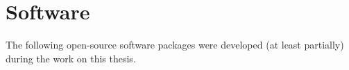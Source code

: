 \chapter*{Software}
The following open-source software packages were developed (at least partially) during the work
on this thesis.

\begin{refsection}[ownsoft]
    \small
    \nocite{*} %
    \printbibliography[heading=none,maxnames=99]
\end{refsection}
